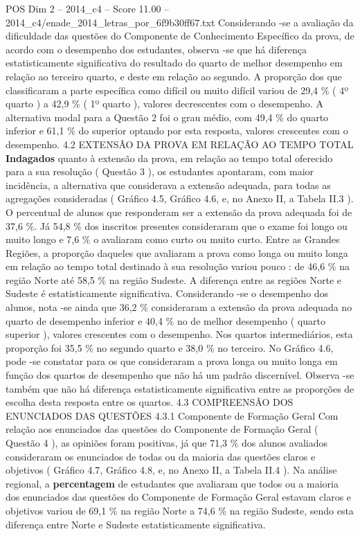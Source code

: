 \begin{textsample}{POS Dim 2 – 2014\_c4 – Score 11.00 – 2014\_c4/enade\_2014\_letras\_por\_6f9b30ff67.txt}
Considerando -se a avaliação da dificuldade das questões do Componente de Conhecimento Específico da prova, de acordo com o desempenho dos estudantes, observa -se que há diferença estatisticamente significativa do resultado do quarto de melhor desempenho em relação ao terceiro quarto, e deste em relação ao segundo.
A proporção dos que classificaram a parte específica como difícil ou muito difícil variou de 29,4 \% ( 4º quarto ) a 42,9 \% ( 1º quarto ), valores decrescentes com o desempenho.
A alternativa modal para a Questão 2 foi o grau médio, com 49,4 \% do quarto inferior e 61,1 \% do superior optando por esta resposta, valores crescentes com o desempenho. 4.2 EXTENSÃO DA PROVA EM RELAÇÃO AO TEMPO TOTAL \textbf{Indagados} quanto à extensão da prova, em relação ao tempo total oferecido para a sua resolução ( Questão 3 ), os estudantes apontaram, com maior incidência, a alternativa que considerava a extensão adequada, para todas as agregações consideradas ( Gráfico 4.5, Gráfico 4.6, e, no Anexo II, a Tabela II.3 ).
O percentual de alunos que responderam ser a extensão da prova adequada foi de 37,6 \%.
Já 54,8 \% dos inscritos presentes consideraram que o exame foi longo ou muito longo e 7,6 \% o avaliaram como curto ou muito curto.
Entre as Grandes Regiões, a proporção daqueles que avaliaram a prova como longa ou muito longa em relação ao tempo total destinado à sua resolução variou pouco : de 46,6 \% na região Norte até 58,5 \% na região Sudeste.
A diferença entre as regiões Norte e Sudeste é estatisticamente significativa.
Considerando -se o desempenho dos alunos, nota -se ainda que 36,2 \% consideraram a extensão da prova adequada no quarto de desempenho inferior e 40,4 \% no de melhor desempenho ( quarto superior ), valores crescentes com o desempenho.
Nos quartos intermediários, esta proporção foi 35,5 \% no segundo quarto e 38,0 \% no terceiro.
No Gráfico 4.6, pode -se constatar para os que consideraram a prova longa ou muito longa em função dos quartos de desempenho que não há um padrão discernível.
Observa -se também que não há diferença estatisticamente significativa entre as proporções de escolha desta resposta entre os quartos. 4.3 COMPREENSÃO DOS ENUNCIADOS DAS QUESTÕES 4.3.1 Componente de Formação Geral Com relação aos enunciados das questões do Componente de Formação Geral ( Questão 4 ), as opiniões foram positivas, já que 71,3 \% dos alunos avaliados consideraram os enunciados de todas ou da maioria das questões claros e objetivos ( Gráfico 4.7, Gráfico 4.8, e, no Anexo II, a Tabela II.4 ).
Na análise regional, a \textbf{percentagem} de estudantes que avaliaram que todos ou a maioria dos enunciados das questões do Componente de Formação Geral estavam claros e objetivos variou de 69,1 \% na região Norte a 74,6 \% na região Sudeste, sendo esta diferença entre Norte e Sudeste estatisticamente significativa.

\end{textsample}
